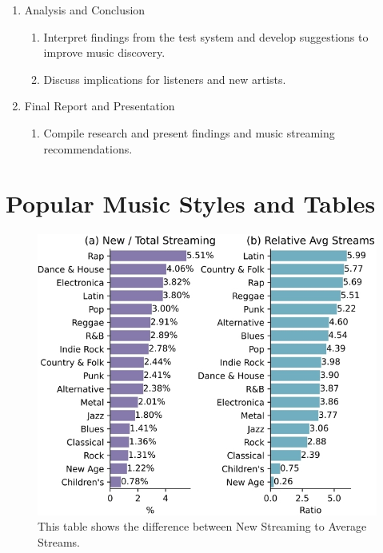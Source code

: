 \documentclass[runningheads]{llncs}
\begin{document}
\begin{enumerate}
\begin{enumerate}
    \end{enumerate}
\item Analysis and Conclusion
    \begin{enumerate}
        \item Interpret findings from the test system and develop suggestions to improve music discovery.
        \item Discuss implications for listeners and new artists. 
    \end{enumerate}
\item Final Report and Presentation
    \begin{enumerate}
        \item Compile research and present findings and music streaming recommendations.
    \end{enumerate}
\end{enumerate}


\section{Popular Music Styles and Tables}

\begin{figure}
\includegraphics[width=\textwidth]{streaming 2.jpg}
\caption{This table shows the difference between New Streaming to Average Streams.} 
\label{fig1}
\end{figure}
\end{document}
